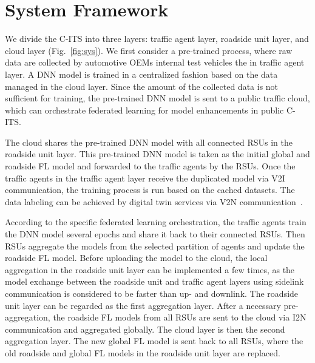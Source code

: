 

\section{System Framework}
\label{sec:system}



We divide the C-ITS into three layers: traffic agent layer, roadside unit layer, and cloud layer (Fig.~\ref{fig:sys}). We first consider a pre-trained process, where raw data are collected by automotive OEMs internal test vehicles the in traffic agent layer. A DNN model is trained in a centralized fashion based on the data managed in the cloud layer. Since the amount of the collected data is not sufficient for training, the pre-trained DNN model is sent to a public traffic cloud, which can orchestrate federated learning for model enhancements in public C-ITS.



The cloud shares the pre-trained DNN model with all connected RSUs in the roadside unit layer. This pre-trained DNN model is taken as the initial global and roadside FL model and forwarded to the traffic agents by the RSUs. Once the traffic agents in the traffic agent layer receive the duplicated model via V2I communication, the training process is run based on the cached datasets. The data labeling can be achieved by digital twin services via V2N communication~\cite{Cress2021_ITSReview}. 



According to the specific federated learning orchestration, the traffic agents train the DNN model several epochs and share it back to their connected RSUs. Then RSUs aggregate the models from the selected partition of agents and update the roadside FL model. Before uploading the model to the cloud, the local aggregation in the roadside unit layer can be implemented a few times, as the model exchange between the roadside unit and traffic agent layers using sidelink communication is considered to be faster than up- and downlink. The roadside unit layer can be regarded as the first aggregation layer. After a necessary pre-aggregation, the roadside FL models from all RSUs are sent to the cloud via I2N communication and aggregated globally. The cloud layer is then the second aggregation layer. The new global FL model is sent back to all RSUs, where the old roadside and global FL models in the roadside unit layer are replaced.

